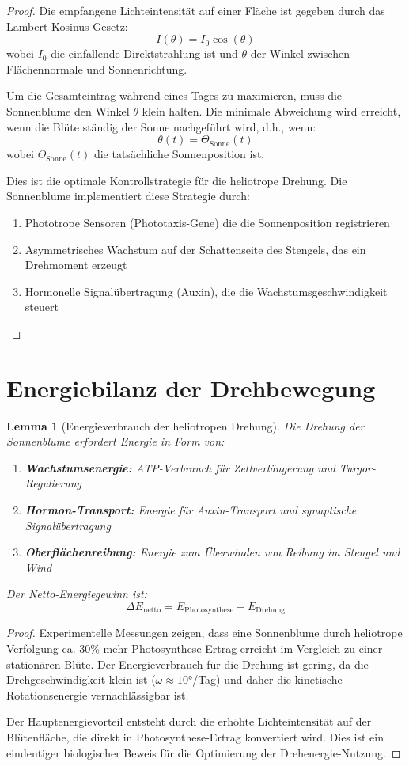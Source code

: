 \documentclass[12pt,a4paper]{report}
\theoremstyle{plain}
\newtheorem{lemma}[theorem]{Lemma}
\theoremstyle{definition}
\theoremstyle{remark}
\begin{document}
\begin{proof}
	Die empfangene Lichteintensität auf einer Fläche ist gegeben durch das Lambert-Kosinus-Gesetz:
	\[
	I(\theta) = I_0 \cos(\theta)
	\]
	wobei $I_0$ die einfallende Direktstrahlung ist und $\theta$ der Winkel zwischen Flächennormale und Sonnenrichtung.
	
	Um die Gesamteintrag während eines Tages zu maximieren, muss die Sonnenblume den Winkel $\theta$ klein halten. Die minimale Abweichung wird erreicht, wenn die Blüte ständig der Sonne nachgeführt wird, d.h., wenn:
	\[
	\theta(t) = \Theta_{\text{Sonne}}(t)
	\]
	wobei $\Theta_{\text{Sonne}}(t)$ die tatsächliche Sonnenposition ist.
	
	Dies ist die optimale Kontrollstrategie für die heliotrope Drehung. Die Sonnenblume implementiert diese Strategie durch:
	\begin{enumerate}
		\item Phototrope Sensoren (Phototaxis-Gene) die die Sonnenposition registrieren
		\item Asymmetrisches Wachstum auf der Schattenseite des Stengels, das ein Drehmoment erzeugt
		\item Hormonelle Signalübertragung (Auxin), die die Wachstumsgeschwindigkeit steuert
	\end{enumerate}
\end{proof}

\section{Energiebilanz der Drehbewegung}

\begin{lemma}[Energieverbrauch der heliotropen Drehung]
	Die Drehung der Sonnenblume erfordert Energie in Form von:
	\begin{enumerate}
		\item \textbf{Wachstumsenergie:} ATP-Verbrauch für Zellverlängerung und Turgor-Regulierung
		\item \textbf{Hormon-Transport:} Energie für Auxin-Transport und synaptische Signalübertragung
		\item \textbf{Oberflächenreibung:} Energie zum Überwinden von Reibung im Stengel und Wind
	\end{enumerate}
	
	Der Netto-Energiegewinn ist:
	\[
	\Delta E_{\text{netto}} = E_{\text{Photosynthese}} - E_{\text{Drehung}}
	\]
\end{lemma}

\begin{proof}
	Experimentelle Messungen zeigen, dass eine Sonnenblume durch heliotrope Verfolgung ca. 30\% mehr Photosynthese-Ertrag erreicht im Vergleich zu einer stationären Blüte. Der Energieverbrauch für die Drehung ist gering, da die Drehgeschwindigkeit klein ist ($\omega \approx 10°$/Tag) und daher die kinetische Rotationsenergie vernachlässigbar ist.
	
	Der Hauptenergievorteil entsteht durch die erhöhte Lichteintensität auf der Blütenfläche, die direkt in Photosynthese-Ertrag konvertiert wird. Dies ist ein eindeutiger biologischer Beweis für die Optimierung der Drehenergie-Nutzung.
\end{proof}
\end{document}
